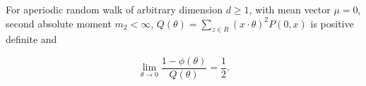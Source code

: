 For aperiodic random walk of arbitrary dimension $d \geq 1$, with mean vector $\mu = 0$, second absolute moment $m_2 < \infty$, $Q(\theta) = \sum_{z \in R} (x \cdot \theta)^2 P(0,x)$ is positive definite and

$$\lim_{\theta \to 0} \frac{1 - \phi(\theta)}{Q(\theta)} = \frac{1}{2}.$$